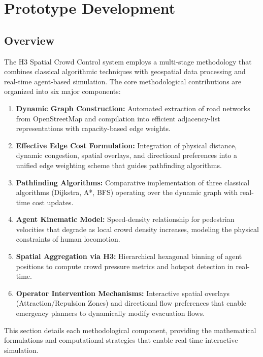 \documentclass[12pt,a4paper,oneside]{report}
\begin{document}
\chapter{Prototype Development}

\section{Overview}
The H3 Spatial Crowd Control system employs a multi-stage methodology that combines classical algorithmic techniques with geospatial data processing and real-time agent-based simulation. The core methodological contributions are organized into six major components:

\begin{enumerate}
    \item \textbf{Dynamic Graph Construction:} Automated extraction of road networks from OpenStreetMap and compilation into efficient adjacency-list representations with capacity-based edge weights.
    \item \textbf{Effective Edge Cost Formulation:} Integration of physical distance, dynamic congestion, spatial overlays, and directional preferences into a unified edge weighting scheme that guides pathfinding algorithms.
    \item \textbf{Pathfinding Algorithms:} Comparative implementation of three classical algorithms (Dijkstra, A*, BFS) operating over the dynamic graph with real-time cost updates.
    \item \textbf{Agent Kinematic Model:} Speed-density relationship for pedestrian velocities that degrade as local crowd density increases, modeling the physical constraints of human locomotion.
    \item \textbf{Spatial Aggregation via H3:} Hierarchical hexagonal binning of agent positions to compute crowd pressure metrics and hotspot detection in real-time.
    \item \textbf{Operator Intervention Mechanisms:} Interactive spatial overlays (Attraction/Repulsion Zones) and directional flow preferences that enable emergency planners to dynamically modify evacuation flows.
\end{enumerate}

This section details each methodological component, providing the mathematical formulations and computational strategies that enable real-time interactive simulation.
\end{document}
